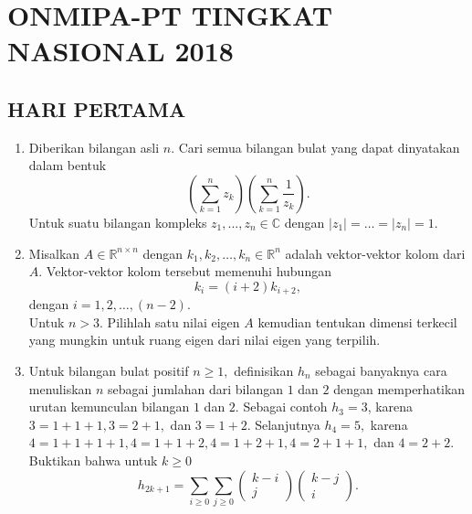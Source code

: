 \documentclass[12pt,twoside]{article}
\begin{document}
\section{ONMIPA-PT TINGKAT NASIONAL 2018}
\subsection{HARI PERTAMA}
\begin{enumerate}
    \item Diberikan bilangan asli $n$. Cari semua bilangan bulat yang dapat dinyatakan dalam bentuk
          \begin{equation*}
              \left( \displaystyle\sum_{k=1}^{n} z_k \right)\left( \displaystyle\sum_{k=1}^{n} \dfrac{1}{z_k} \right).
          \end{equation*}
          Untuk suatu bilangan kompleks $z_1,\dots,z_n \in \mathbb{C}$ dengan $|z_1|=\dots = |z_n|=1$.


    \item Misalkan $A \in \mathbb{R}^{n\times n}$ dengan $k_1,k_2,\dots,k_n \in \mathbb{R}^n$ adalah vektor-vektor kolom dari $A$. Vektor-vektor kolom tersebut memenuhi hubungan
          \begin{equation*}
              k_i = (i+2)k_{i+2},
          \end{equation*}
          dengan $i = 1,2,\dots,(n-2)$.\\Untuk $n>3$. Pilihlah satu nilai eigen $A$ kemudian tentukan dimensi terkecil yang mungkin untuk ruang eigen dari nilai eigen yang terpilih.


    \item Untuk bilangan bulat positif $n \geq 1,$ definisikan $h_n$ sebagai banyaknya cara menuliskan $n$ sebagai jumlahan dari bilangan $1$ dan $2$ dengan memperhatikan urutan kemunculan bilangan $1$ dan $2$. Sebagai contoh $h_3 = 3$, karena $3=1+1+1,3=2+1,$ dan $3=1+2.$ Selanjutnya $h_4=5,$ karena $4 = 1+1+1+1, 4= 1+1+2, 4=1+2+1,4=2+1+1,$ dan $4 = 2+2$. Buktikan bahwa untuk $k \geq 0$
          \begin{equation*}
              h_{2k+1} = \displaystyle\sum_{i\geq 0}^{}\sum_{j\geq 0}^{} \begin{pmatrix}
                  k-i \\j
              \end{pmatrix}\begin{pmatrix}
                  k-j \\i
              \end{pmatrix}.
          \end{equation*}



\end{enumerate}
\end{document}
